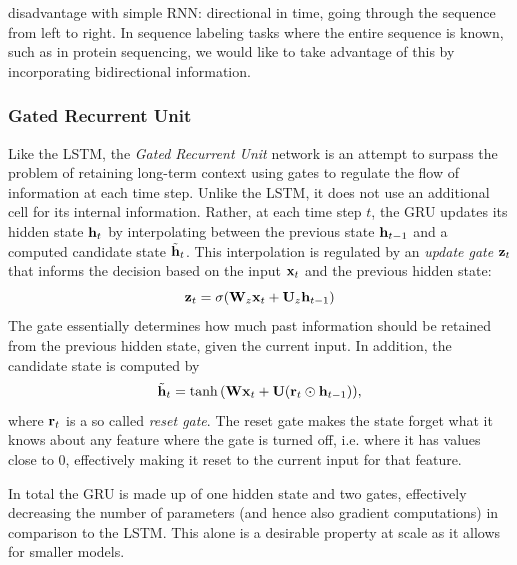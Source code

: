 \documentclass[a4paper,12pt]{article}
\begin{document}

 disadvantage with simple RNN: directional in time, going through the sequence from left to right. In sequence labeling tasks where the entire sequence is known, such as in protein sequencing, we would like to take advantage of this by incorporating bidirectional information.

\subsubsection{Gated Recurrent Unit}
Like the LSTM, the \textit{Gated Recurrent Unit} network is an attempt to surpass the problem of retaining long-term context using gates to regulate the flow of information at each time step. Unlike the LSTM, it does not use an additional cell for its internal information. Rather, at each time step $t$, the GRU updates its hidden state $\mathbf{ h }_{t}$ by interpolating between the previous state $\mathbf{ h }_{t - 1}$ and a computed candidate state $\tilde{\mathbf{ h }}_t$. This interpolation is regulated by an \textit{update gate} $\mathbf{ z }_t$ that informs the decision based on the input $\mathbf{ x }_t$ and the previous hidden state:
\[\mathbf{ z }_t = \sigma{\mathopen{} \left( \mathbf{ W }_z \mathbf{ x }_t + \mathbf{ U }_z \mathbf{ h }_{t-1}  \right) \mathclose{}}\]
The gate essentially determines how much past information should be retained from the previous hidden state, given the current input. In addition, the candidate state is computed by
\[\tilde{\mathbf{ h }}_t = \operatorname{tanh}{\mathopen{} \left( \mathbf{ Wx }_t + \mathbf{ U }{\mathopen{} \left( \mathbf{ r }_t \odot \mathbf{ h }_{t-1} \right) \mathclose{}} \right) \mathclose{}},\]
where $\mathbf{ r }_t$ is a so called \textit{reset gate}. The reset gate makes the state forget what it knows about any feature where the gate is turned off, i.e. where it has values close to 0, effectively making it reset to the current input for that feature. 

In total the GRU is made up of one hidden state and two gates, effectively decreasing the number of parameters (and hence also gradient computations) in comparison to the LSTM. This alone is a desirable property at scale as it allows for smaller models.
\end{document}
